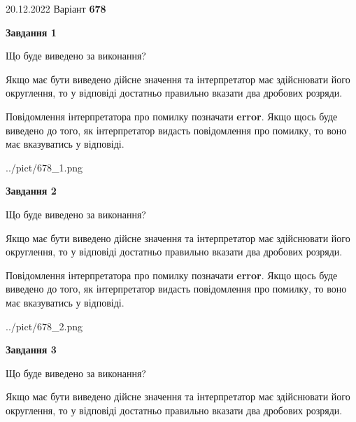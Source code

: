 \documentclass[12pt, ukrainian]{article}
\begin{document}
{20.12.2022 Варіант \No \textbf { 678 }\par}
{
\begin {Large}

{\begin {center}\textbf{Завдання 1}\end {center}}\par
Що буде виведено за виконання? \par

Якщо має бути виведено дійсне значення та інтерпретатор має здійснювати його округлення, 
то у відповіді достатньо правильно вказати два дробових розряди.

Повідомлення інтерпретатора про помилку позначати \textbf{error}.
Якщо щось буде виведено до того, як інтерпретатор видасть повідомлення про помилку, 
то воно має вказуватись у відповіді. \par

\begin{center}
	{../pict/678_1.png}
\end{center}
\newpage

{\begin {center}\textbf{Завдання 2}\end {center}}\par
Що буде виведено за виконання? \par

Якщо має бути виведено дійсне значення та інтерпретатор має здійснювати його округлення, 
то у відповіді достатньо правильно вказати два дробових розряди.

Повідомлення інтерпретатора про помилку позначати \textbf{error}.
Якщо щось буде виведено до того, як інтерпретатор видасть повідомлення про помилку, 
то воно має вказуватись у відповіді. \par

\begin{center}
	{../pict/678_2.png}
\end{center}
\newpage

{\begin {center}\textbf{Завдання 3}\end {center}}\par
Що буде виведено за виконання? \par

Якщо має бути виведено дійсне значення та інтерпретатор має здійснювати його округлення, 
то у відповіді достатньо правильно вказати два дробових розряди.


\end{Large}}
\end{document}
